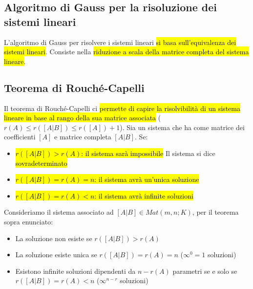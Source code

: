\documentclass[a4paper,12pt,oneside]{article}
\begin{document}
\subsection{Algoritmo di Gauss per la risoluzione dei sistemi lineari}
L'algoritmo di Gauss per risolvere i sistemi lineari \hl{si basa sull'equivalenza
dei sistemi lineari}. Consiste nella \hl{riduzione a scala della matrice completa
del sistema lineare}.

\subsection{Teorema di Rouché-Capelli}
Il teorema di Rouché-Capelli ci \hl{permette di capire la risolvibilità di un sistema
lineare in base al rango della sua matrice associata}
($r(A) \leq r([A|B]) \leq r([A]) + 1$). Sia un sistema che ha come matrice dei
coefficienti $[A]$ e matrice completa $[A|B]$. Se:
\begin{itemize}
    \item \hl{$r([A|B]) > r(A)$: il sistema sarà impossibile} Il sistema si dice
        \hl{sovradeterminato}
    \item \hl{$r([A|B]) = r(A) = n$: il sistema avrà un'unica soluzione}
    \item \hl{$r([A|B]) = r(A) < n$: il sistema avrà infinite soluzioni}
\end{itemize}

Consideriamo il sistema associato ad $[A|B] \in Mat(m,n;K)$, per il teorema
sopra enunciato:
\begin{itemize}
    \item La soluzione non esiste se $r([A|B]) > r(A)$
    \item La soluzione esiste unica se $r([A|B]) = r(A) = n$ ($\infty^{0} = 1$
        soluzioni)
    \item Esistono infinite soluzioni dipendenti da $n-r(A)$ parametri se e
        solo se $r([A|B]) = r(A) < n$ ($\infty^{n-r}$ soluzioni)
\end{itemize}
\end{document}

